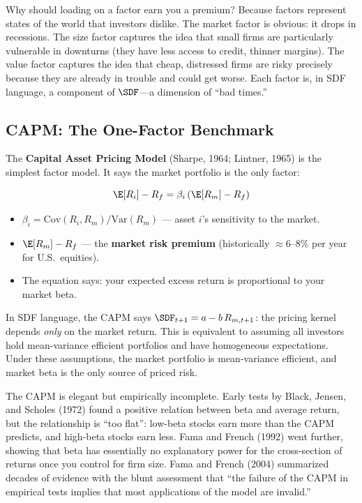 \begin{intuition}
Why should loading on a factor earn you a premium? Because factors represent states of the world that investors dislike. The market factor is obvious: it drops in recessions. The size factor captures the idea that small firms are particularly vulnerable in downturns (they have less access to credit, thinner margins). The value factor captures the idea that cheap, distressed firms are risky precisely because they are already in trouble and could get worse. Each factor is, in SDF language, a component of $\SDF$---a dimension of ``bad times.''
\end{intuition}

\subsection{CAPM: The One-Factor Benchmark}

The \textbf{Capital Asset Pricing Model} (Sharpe, 1964; Lintner, 1965) is the simplest factor model. It says the market portfolio is the only factor:

\begin{equation}
\E[R_i] - R_f = \beta_i \, (\E[R_m] - R_f)
\label{eq:capm}
\end{equation}
\begin{itemize}[nosep]
  \item $\beta_i = \text{Cov}(R_i, R_m) / \text{Var}(R_m)$ --- asset $i$'s sensitivity to the market.
  \item $\E[R_m] - R_f$ --- the \textbf{market risk premium} (historically ${\approx}6$--$8\%$ per year for U.S.\ equities).
  \item The equation says: your expected excess return is proportional to your market beta.
\end{itemize}

In SDF language, the CAPM says $\SDF_{t+1} = a - b \, R_{m,t+1}$: the pricing kernel depends \emph{only} on the market return. This is equivalent to assuming all investors hold mean-variance efficient portfolios and have homogeneous expectations. Under these assumptions, the market portfolio is mean-variance efficient, and market beta is the only source of priced risk.

The CAPM is elegant but empirically incomplete. Early tests by Black, Jensen, and Scholes (1972) found a positive relation between beta and average return, but the relationship is ``too flat'': low-beta stocks earn more than the CAPM predicts, and high-beta stocks earn less. Fama and French (1992) went further, showing that beta has essentially no explanatory power for the cross-section of returns once you control for firm size. Fama and French (2004) summarized decades of evidence with the blunt assessment that ``the failure of the CAPM in empirical tests implies that most applications of the model are invalid.''

